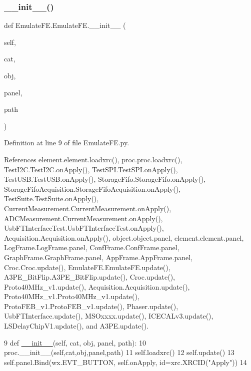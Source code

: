 \subsubsection{\texorpdfstring{\+\_\+\+\_\+init\+\_\+\+\_\+()}{\_\_init\_\_()}}
{\footnotesize\ttfamily def Emulate\+F\+E.\+Emulate\+F\+E.\+\_\+\+\_\+init\+\_\+\+\_\+ (\begin{DoxyParamCaption}\item[{}]{self,  }\item[{}]{cat,  }\item[{}]{obj,  }\item[{}]{panel,  }\item[{}]{path }\end{DoxyParamCaption})}



Definition at line 9 of file Emulate\+F\+E.\+py.



References element.\+element.\+loadxrc(), proc.\+proc.\+loadxrc(), Test\+I2\+C.\+Test\+I2\+C.\+on\+Apply(), Test\+S\+P\+I.\+Test\+S\+P\+I.\+on\+Apply(), Test\+U\+S\+B.\+Test\+U\+S\+B.\+on\+Apply(), Storage\+Fifo.\+Storage\+Fifo.\+on\+Apply(), Storage\+Fifo\+Acquisition.\+Storage\+Fifo\+Acquisition.\+on\+Apply(), Test\+Suite.\+Test\+Suite.\+on\+Apply(), Current\+Measurement.\+Current\+Measurement.\+on\+Apply(), A\+D\+C\+Measurement.\+Current\+Measurement.\+on\+Apply(), Usb\+F\+T\+Interface\+Test.\+Usb\+F\+T\+Interface\+Test.\+on\+Apply(), Acquisition.\+Acquisition.\+on\+Apply(), object.\+object.\+panel, element.\+element.\+panel, Log\+Frame.\+Log\+Frame.\+panel, Conf\+Frame.\+Conf\+Frame.\+panel, Graph\+Frame.\+Graph\+Frame.\+panel, App\+Frame.\+App\+Frame.\+panel, Croc.\+Croc.\+update(), Emulate\+F\+E.\+Emulate\+F\+E.\+update(), A3\+P\+E\+\_\+\+Bit\+Flip.\+A3\+P\+E\+\_\+\+Bit\+Flip.\+update(), Croc.\+update(), Proto40\+M\+Hz\+\_\+v1.\+update(), Acquisition.\+Acquisition.\+update(), Proto40\+M\+Hz\+\_\+v1.\+Proto40\+M\+Hz\+\_\+v1.\+update(), Proto\+F\+E\+B\+\_\+v1.\+Proto\+F\+E\+B\+\_\+v1.\+update(), Phaser.\+update(), Usb\+F\+T\+Interface.\+update(), M\+S\+Oxxxx.\+update(), I\+C\+E\+C\+A\+Lv3.\+update(), L\+S\+Delay\+Chip\+V1.\+update(), and A3\+P\+E.\+update().


\begin{DoxyCode}
9     \textcolor{keyword}{def }\hyperlink{classwrapper_1_1ModuleDictWrapper_a9a7a794150502f51df687831583e13b9}{\_\_init\_\_}(self, cat, obj, panel, path):
10         proc.\_\_init\_\_(self,cat,obj,panel,path)
11         self.loadxrc()
12         self.update()
13         self.panel.Bind(wx.EVT\_BUTTON, self.onApply, id=xrc.XRCID(\textcolor{stringliteral}{"Apply"}))
14 
\end{DoxyCode}


